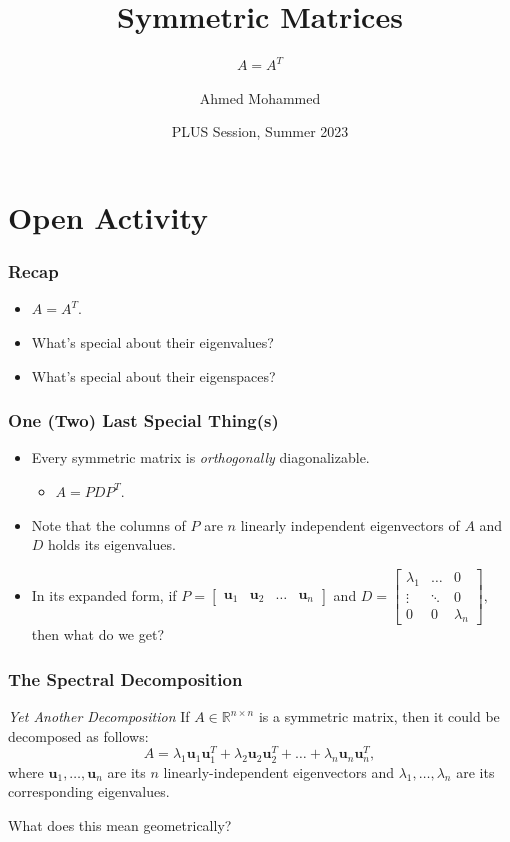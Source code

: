 \documentclass{beamer}
\title{Symmetric Matrices}
\subtitle{\(A = A^T\)}
\author{Ahmed Mohammed}
\institute{Georgia Institute of Technology}
\date{PLUS Session, Summer 2023}
\renewcommand{\vec}[1]{\mathbf{#1}}
\begin{document}
	\begin{frame}
		\maketitle
	\end{frame}

	\section{Open Activity}
	\begin{frame}
		\frametitle{Recap}
		\begin{itemize}
			\item<1-> \(A = A^T.\)
			\item<2-> What's special about their eigenvalues?
			\item<3-> What's special about their eigenspaces?
		\end{itemize}
	\end{frame}

	\begin{frame}
		\frametitle{One (Two) Last Special Thing(s)}
		\begin{itemize}
			\item<1-> Every symmetric matrix is \emph{orthogonally} diagonalizable.
				\begin{itemize}[<+(1)->]
					\item \(A = PDP^T.\)
				\end{itemize}
			\item<2-> Note that the columns of \(P\) are \(n\) linearly independent eigenvectors of \(A\) and \(D\) holds its eigenvalues.
			\item<3-> In its expanded form, if \(P = \begin{bmatrix}\vec{u}_1 & \vec{u}_2 & \dots & \vec{u}_n\end{bmatrix}\) and 
					\(D = \begin{bmatrix}\lambda_1 & \dots & 0 \\ \vdots & \ddots & 0 \\ 0 & 0 & \lambda_n \end{bmatrix},\) then what do we get?
		\end{itemize}
	\end{frame}

	\begin{frame}
		\frametitle{The Spectral Decomposition}
		\begin{block}{\textit{Yet Another Decomposition}}
			If \(A \in \mathbb{R}^{n \times n}\) is a symmetric matrix, then it could be decomposed as follows: 
			\[A = \lambda_1 \vec{u}_1\vec{u}_1^T + \lambda_2 \vec{u}_2\vec{u}_2^T + \dots + \lambda_n\vec{u}_n\vec{u}_n^T,\] where 
			\(\vec{u}_1, \dots, \vec{u}_n\) are its \(n\) linearly-independent eigenvectors and \(\lambda_1, \dots, \lambda_n\) are its corresponding 
			eigenvalues.
		\end{block}
		What does this mean geometrically?
	\end{frame}
\end{document}
